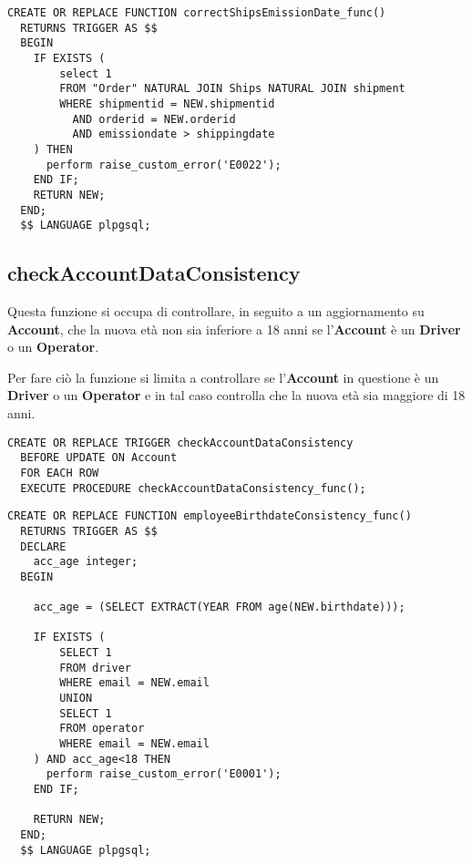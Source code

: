 \begin{lstlisting}[caption={Funzione \textbf{correctShipsEmissionDate}}]
  CREATE OR REPLACE FUNCTION correctShipsEmissionDate_func()
  RETURNS TRIGGER AS $$
  BEGIN
    IF EXISTS (
        select 1 
        FROM "Order" NATURAL JOIN Ships NATURAL JOIN shipment
        WHERE shipmentid = NEW.shipmentid 
          AND orderid = NEW.orderid
          AND emissiondate > shippingdate
    ) THEN
      perform raise_custom_error('E0022');
    END IF;
    RETURN NEW;
  END;
  $$ LANGUAGE plpgsql;
\end{lstlisting}

\subsection{\textbf{checkAccountDataConsistency}}

Questa funzione si occupa di controllare, in seguito a un aggiornamento su \textbf{Account}, che la nuova età non sia inferiore a 18 anni se l'\textbf{Account} è un \textbf{Driver} o un \textbf{Operator}.

Per fare ciò la funzione si limita a controllare se l'\textbf{Account} in questione è un \textbf{Driver} o un \textbf{Operator} e in tal caso controlla che la nuova età sia maggiore di 18 anni.

\begin{lstlisting}[caption={Trigger per implementare \textbf{checkAccountDataConsistency}}]
  CREATE OR REPLACE TRIGGER checkAccountDataConsistency
  BEFORE UPDATE ON Account
  FOR EACH ROW
  EXECUTE PROCEDURE checkAccountDataConsistency_func();
\end{lstlisting}

\begin{lstlisting}[caption={Funzione \textbf{checkAccountDataConsistency}}]
  CREATE OR REPLACE FUNCTION employeeBirthdateConsistency_func()
  RETURNS TRIGGER AS $$
  DECLARE
    acc_age integer;
  BEGIN

    acc_age = (SELECT EXTRACT(YEAR FROM age(NEW.birthdate)));

    IF EXISTS (
        SELECT 1 
        FROM driver
        WHERE email = NEW.email
        UNION 
        SELECT 1
        FROM operator
        WHERE email = NEW.email
    ) AND acc_age<18 THEN
      perform raise_custom_error('E0001');
    END IF;

    RETURN NEW;
  END;
  $$ LANGUAGE plpgsql;
\end{lstlisting}
